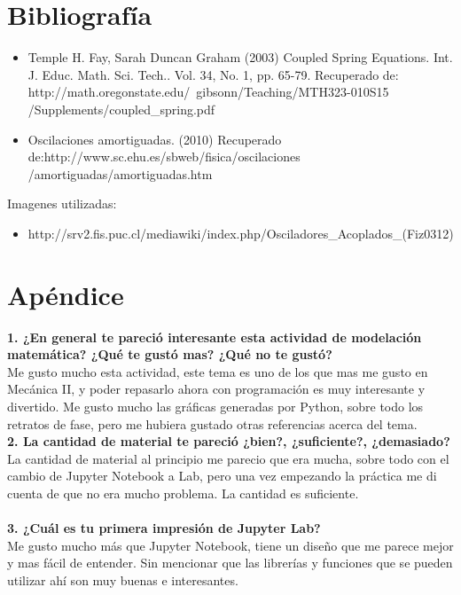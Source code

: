 \documentclass[12pt]{article}
\begin{document}
\section{Bibliografía}
\begin{itemize}
    \item Temple H. Fay, Sarah Duncan Graham (2003) Coupled Spring Equations. Int. J. Educ. Math. Sci. Tech.. Vol. 34, No. 1, pp. 65-79. Recuperado de: http://math.oregonstate.edu/~gibsonn/Teaching/MTH323-010S15 \\ /Supplements/coupled\_spring.pdf
    \item Oscilaciones amortiguadas. (2010) Recuperado de:http://www.sc.ehu.es/sbweb/fisica/oscilaciones \\ /amortiguadas/amortiguadas.htm
\end{itemize}

Imagenes utilizadas:
\begin{itemize}
    \item http://srv2.fis.puc.cl/mediawiki/index.php/Osciladores\_Acoplados\_(Fiz0312)
\end{itemize}
\section{Apéndice}
\noindent\textbf {1. ¿En general te pareció interesante esta actividad de modelación matemática? ¿Qué te gustó mas? ¿Qué no te gustó?} \\

Me gusto mucho esta actividad, este tema es uno de los que mas me gusto en Mecánica II, y poder repasarlo ahora con programación es muy interesante y divertido. Me gusto mucho las gráficas generadas por Python, sobre todo los retratos de fase, pero me hubiera gustado otras referencias acerca del tema. \\

\noindent\textbf {2. La cantidad de material te pareció ¿bien?, ¿suficiente?, ¿demasiado?}\\

La cantidad de material al principio me parecio que era mucha, sobre todo con el cambio de Jupyter Notebook a Lab, pero una vez empezando la práctica me di cuenta de que no era mucho problema. La cantidad es suficiente. \\ \\

\noindent\textbf {3. ¿Cuál es tu primera impresión de Jupyter Lab?  } \\

Me gusto mucho más que Jupyter Notebook, tiene un diseño que me parece mejor  y mas fácil de entender. Sin mencionar que las librerías y funciones que se pueden utilizar ahí son muy buenas e interesantes. \\
\end{document}
